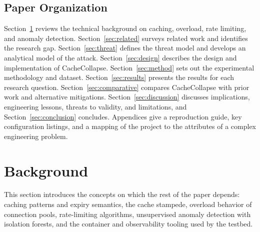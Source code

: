 \documentclass[preprint,12pt]{elsarticle}
\begin{document}
\subsection{Paper Organization}
Section~\ref{sec:background} reviews the technical background on caching, overload,
rate limiting, and anomaly detection. Section~\ref{sec:related} surveys related work
and identifies the research gap. Section~\ref{sec:threat} defines the threat model and
develops an analytical model of the attack. Section~\ref{sec:design} describes the
design and implementation of CacheCollapse. Section~\ref{sec:method} sets out the
experimental methodology and dataset. Section~\ref{sec:results} presents the results
for each research question. Section~\ref{sec:comparative} compares CacheCollapse with
prior work and alternative mitigations. Section~\ref{sec:discussion} discusses
implications, engineering lessons, threats to validity, and limitations, and
Section~\ref{sec:conclusion} concludes. Appendices give a reproduction guide, key
configuration listings, and a mapping of the project to the attributes of a complex
engineering problem.

\section{Background}
\label{sec:background}

This section introduces the concepts on which the rest of the paper depends: caching
patterns and expiry semantics, the cache stampede, overload behavior of connection
pools, rate-limiting algorithms, unsupervised anomaly detection with isolation
forests, and the container and observability tooling used by the testbed.
\end{document}
